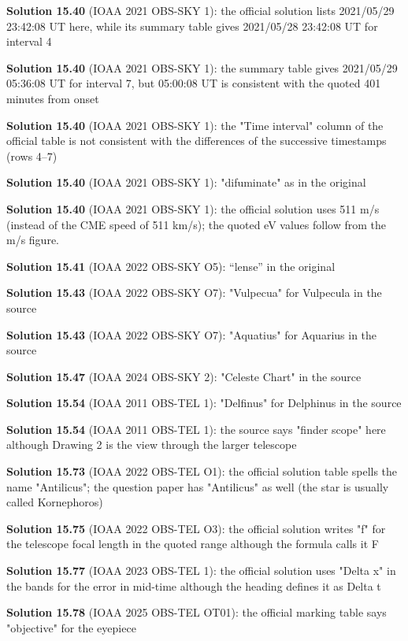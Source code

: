 \noindent\textbf{Solution 15.40} (IOAA 2021 OBS-SKY 1): the official solution lists 2021/05/29 23:42:08 UT here, while its summary table gives 2021/05/28 23:42:08 UT for interval 4
\smallskip

\noindent\textbf{Solution 15.40} (IOAA 2021 OBS-SKY 1): the summary table gives 2021/05/29 05:36:08 UT for interval 7, but 05:00:08 UT is consistent with the quoted 401 minutes from onset
\smallskip

\noindent\textbf{Solution 15.40} (IOAA 2021 OBS-SKY 1): the "Time interval" column of the official table is not consistent with the differences of the successive timestamps (rows 4--7)
\smallskip

\noindent\textbf{Solution 15.40} (IOAA 2021 OBS-SKY 1): "difuminate" as in the original
\smallskip

\noindent\textbf{Solution 15.40} (IOAA 2021 OBS-SKY 1): the official solution uses 511 m/s (instead of the CME speed of 511 km/s); the quoted eV values follow from the m/s figure.
\smallskip

\noindent\textbf{Solution 15.41} (IOAA 2022 OBS-SKY O5): ``lense'' in the original
\smallskip

\noindent\textbf{Solution 15.43} (IOAA 2022 OBS-SKY O7): "Vulpecua" for Vulpecula in the source
\smallskip

\noindent\textbf{Solution 15.43} (IOAA 2022 OBS-SKY O7): "Aquatius" for Aquarius in the source
\smallskip

\noindent\textbf{Solution 15.47} (IOAA 2024 OBS-SKY 2): "Celeste Chart" in the source
\smallskip

\noindent\textbf{Solution 15.54} (IOAA 2011 OBS-TEL 1): "Delfinus" for Delphinus in the source
\smallskip

\noindent\textbf{Solution 15.54} (IOAA 2011 OBS-TEL 1): the source says "finder scope" here although Drawing 2 is the view through the larger telescope
\smallskip

\noindent\textbf{Solution 15.73} (IOAA 2022 OBS-TEL O1): the official solution table spells the name "Antilicus"; the question paper has "Antilicus" as well (the star is usually called Kornephoros)
\smallskip

\noindent\textbf{Solution 15.75} (IOAA 2022 OBS-TEL O3): the official solution writes "f" for the telescope focal length in the quoted range although the formula calls it F
\smallskip

\noindent\textbf{Solution 15.77} (IOAA 2023 OBS-TEL 1): the official solution uses "Delta x" in the bands for the error in mid-time although the heading defines it as Delta t
\smallskip

\noindent\textbf{Solution 15.78} (IOAA 2025 OBS-TEL OT01): the official marking table says "objective" for the eyepiece
\smallskip
